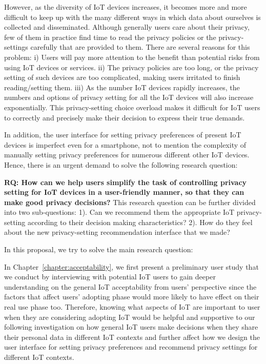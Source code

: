 However, as the diversity of IoT devices increases, it becomes more and more difficult to keep up with the many different ways in which data about ourselves is collected and disseminated. Although generally users care about their privacy, few of them in practice find time to read the privacy policies or the privacy-settings carefully that are provided to them. There are several reasons for this problem: i) Users will pay more attention to the benefit than potential risks from using IoT devices or services. ii) The privacy policies are too long, or the privacy setting of such devices are too complicated, making users irritated to finish reading/setting them. iii) As the number IoT devices rapidly increases, the numbers and options of privacy setting for all the IoT devices will also increase exponentially. This privacy-setting choice overload makes it difficult for IoT users to correctly and precisely make their decision to express their true demands. 

In addition, the user interface for setting privacy preferences of present IoT devices is imperfect even for a smartphone, not to mention the complexity of manually setting privacy preferences for numerous different other IoT devices. Hence, there is an urgent demand to solve the following research question: 

\textbf{RQ: How can we help users simplify the task of controlling privacy setting for IoT devices in a user-friendly manner, so that they can make good privacy decisions?} This research question can be further divided into two sub-questions: 1). Can we recommend them the appropriate IoT privacy-setting according to their decision making characteristics? 2). How do they feel about the new privacy-setting recommendation interface that we made?

In this proposal, we try to solve the main research question:

In Chapter~\ref{chapter:acceptability}, we first present a preliminary user study that we conduct by interviewing with potential IoT users to gain deeper understanding on the general IoT acceptability from users' perspective since the factors that affect users' adopting phase would more likely to have effect on their real use phase too. Therefore, knowing what aspects of IoT are important to user when they are considering adopting IoT would be helpful and supportive to our following investigation on how general IoT users make decisions when they share their personal data in different IoT contexts and further affect how we design the user interface for setting privacy preferences and recommend privacy settings for different IoT contexts.
	
